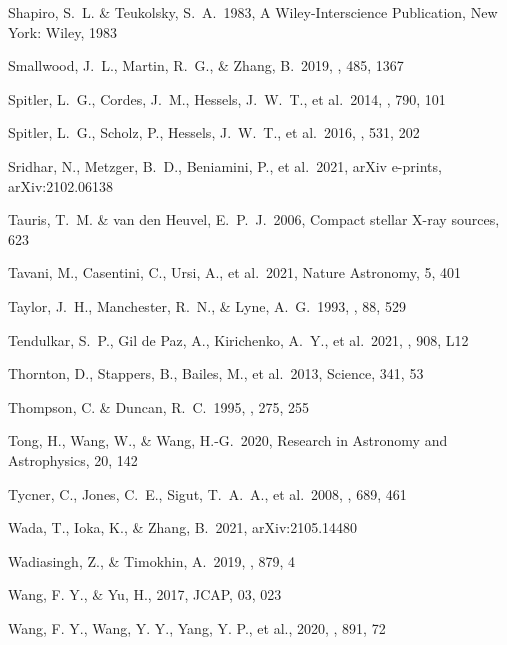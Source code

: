 \documentclass[twocolumn]{aastex62}
\begin{document}
\begin{thebibliography}
 Shapiro, S.~L. \& Teukolsky, S.~A.\ 1983, A Wiley-Interscience Publication, New York: Wiley, 1983

 Smallwood, J.~L., Martin, R.~G., \& Zhang, B.\ 2019, \mnras, 485, 1367

 Spitler, L.~G., Cordes, J.~M., Hessels, J.~W.~T., et al.\ 2014, \apj, 790, 101

 Spitler, L.~G., Scholz, P., Hessels, J.~W.~T., et al.\ 2016, \nat, 531, 202

 Sridhar, N., Metzger, B.~D., Beniamini, P., et al.\ 2021, arXiv e-prints, arXiv:2102.06138

 Tauris, T.~M. \& van den Heuvel, E.~P.~J.\ 2006, Compact stellar X-ray sources, 623

 Tavani, M., Casentini, C., Ursi, A., et al.\ 2021, Nature Astronomy, 5, 401

 Taylor, J.~H., Manchester, R.~N., \& Lyne, A.~G.\ 1993, \apjs, 88, 529

 Tendulkar, S.~P., Gil de Paz, A., Kirichenko, A.~Y., et al.\ 2021, \apjl, 908, L12

 Thornton, D., Stappers, B., Bailes, M., et al.\ 2013, Science, 341, 53

 Thompson, C. \& Duncan, R.~C.\ 1995, \mnras, 275, 255

 Tong, H., Wang, W., \& Wang, H.-G.\ 2020, Research in Astronomy and Astrophysics, 20, 142

 Tycner, C., Jones, C.~E., Sigut, T.~A.~A., et al.\ 2008, \apj, 689, 461

 Wada, T., Ioka, K., \& Zhang, B.\ 2021, arXiv:2105.14480

 Wadiasingh, Z., \& Timokhin, A.\ 2019, \apj, 879, 4

 Wang, F. Y., \& Yu, H., 2017, JCAP, 03, 023

 Wang, F. Y., Wang, Y. Y., Yang, Y. P., et al., 2020, \apj, 891, 72


\end{thebibliography}
\end{document}
